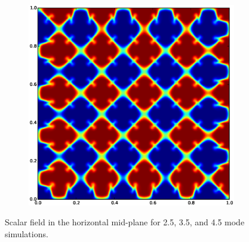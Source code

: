 \begin{figure}
\begin{subfigure}[b]{0.32\textwidth}
\end{subfigure}
\begin{subfigure}[b]{0.32\textwidth}
  \includegraphics[width=\textwidth]{figs/scalar-45-20}
\end{subfigure}
\caption{ 
Scalar field in the horizontal mid-plane for 2.5, 3.5, and 4.5 mode simulations.
}
\end{figure}



